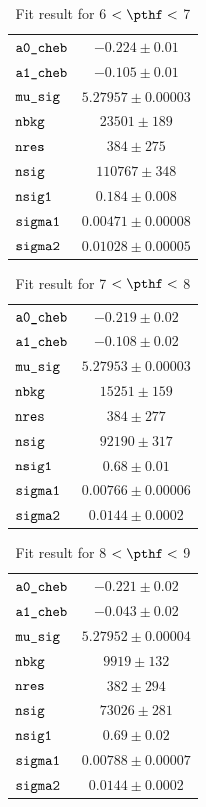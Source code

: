 \begin{table}[H]
    \centering
    \caption{Fit result for 6 $ < \pthf < $ 7}
    \label{tab:fit_results_pthf4}
\begin{tabular}{lc}
$\verb+a0_cheb+ $ & $ -0.224\pm 0.01$\\
$\verb+a1_cheb+ $ & $ -0.105\pm 0.01$\\
$\verb+mu_sig+ $ & $  5.27957\pm 0.00003$\\
$\verb+nbkg+ $ & $  23501\pm 189$\\
$\verb+nres+ $ & $  384\pm 275$\\
$\verb+nsig+ $ & $  110767\pm 348$\\
$\verb+nsig1+ $ & $  0.184\pm 0.008$\\
$\verb+sigma1+ $ & $  0.00471\pm 0.00008$\\
$\verb+sigma2+ $ & $  0.01028\pm 0.00005$\\
\end{tabular}
\end{table}
\begin{table}[H]
    \centering
    \caption{Fit result for 7 $ < \pthf < $ 8}
    \label{tab:fit_results_pthf5}
\begin{tabular}{lc}
$\verb+a0_cheb+ $ & $ -0.219\pm 0.02$\\
$\verb+a1_cheb+ $ & $ -0.108\pm 0.02$\\
$\verb+mu_sig+ $ & $  5.27953\pm 0.00003$\\
$\verb+nbkg+ $ & $  15251\pm 159$\\
$\verb+nres+ $ & $  384\pm 277$\\
$\verb+nsig+ $ & $  92190\pm 317$\\
$\verb+nsig1+ $ & $  0.68\pm 0.01$\\
$\verb+sigma1+ $ & $  0.00766\pm 0.00006$\\
$\verb+sigma2+ $ & $  0.0144\pm 0.0002$\\
\end{tabular}
\end{table}
\begin{table}[H]
    \centering
    \caption{Fit result for 8 $ < \pthf < $ 9}
    \label{tab:fit_results_pthf6}
\begin{tabular}{lc}
$\verb+a0_cheb+ $ & $ -0.221\pm 0.02$\\
$\verb+a1_cheb+ $ & $ -0.043\pm 0.02$\\
$\verb+mu_sig+ $ & $  5.27952\pm 0.00004$\\
$\verb+nbkg+ $ & $  9919\pm 132$\\
$\verb+nres+ $ & $  382\pm 294$\\
$\verb+nsig+ $ & $  73026\pm 281$\\
$\verb+nsig1+ $ & $  0.69\pm 0.02$\\
$\verb+sigma1+ $ & $  0.00788\pm 0.00007$\\
$\verb+sigma2+ $ & $  0.0144\pm 0.0002$\\
\end{tabular}
\end{table}
